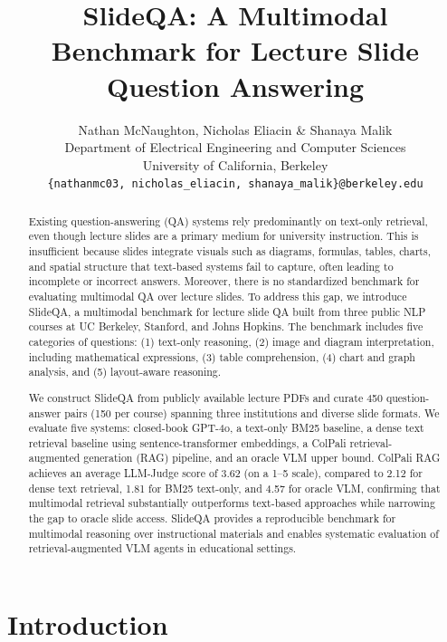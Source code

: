 \documentclass{article} %
\title{SlideQA: A Multimodal Benchmark for Lecture Slide Question Answering}
\author{Nathan McNaughton, Nicholas Eliacin \& Shanaya Malik \\
Department of Electrical Engineering and Computer Sciences \\
University of California, Berkeley \\
\texttt{\{nathanmc03, nicholas\_eliacin, shanaya\_malik\}@berkeley.edu}
}
\begin{document}
\maketitle

\begin{abstract}
Existing question-answering (QA) systems rely predominantly on text-only retrieval, even though lecture slides are a primary medium for university instruction. This is insufficient because slides integrate visuals such as diagrams, formulas, tables, charts, and spatial structure that text-based systems fail to capture, often leading to incomplete or incorrect answers. Moreover, there is no standardized benchmark for evaluating multimodal QA over lecture slides. To address this gap, we introduce SlideQA, a multimodal benchmark for lecture slide QA built from three public NLP courses at UC Berkeley, Stanford, and Johns Hopkins. The benchmark includes five categories of questions: (1) text-only reasoning, (2) image and diagram interpretation, including mathematical expressions, (3) table comprehension, (4) chart and graph analysis, and (5) layout-aware reasoning.

We construct SlideQA from publicly available lecture PDFs and curate 450 question-answer pairs (150 per course) spanning three institutions and diverse slide formats. We evaluate five systems: closed-book GPT-4o, a text-only BM25 baseline, a dense text retrieval baseline using sentence-transformer embeddings, a ColPali retrieval-augmented generation (RAG) pipeline, and an oracle VLM upper bound. ColPali RAG achieves an average LLM-Judge score of 3.62 (on a 1--5 scale), compared to 2.12 for dense text retrieval, 1.81 for BM25 text-only, and 4.57 for oracle VLM, confirming that multimodal retrieval substantially outperforms text-based approaches while narrowing the gap to oracle slide access. SlideQA provides a reproducible benchmark for multimodal reasoning over instructional materials and enables systematic evaluation of retrieval-augmented VLM agents in educational settings.
\end{abstract}

\section{Introduction}
\end{document}
